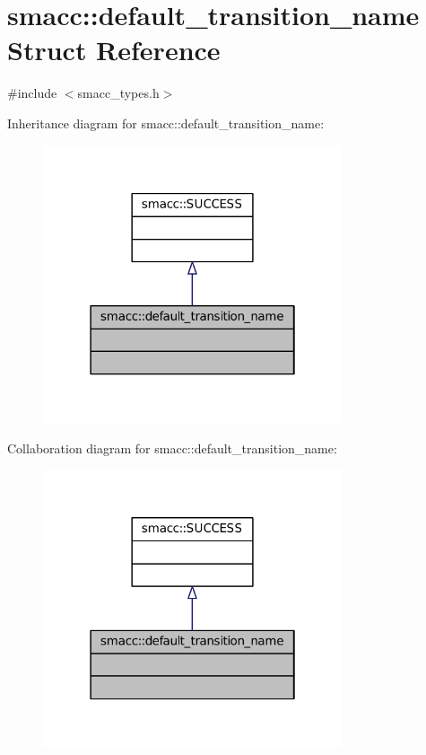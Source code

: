 \hypertarget{structsmacc_1_1default__transition__name}{}\section{smacc\+:\+:default\+\_\+transition\+\_\+name Struct Reference}
\label{structsmacc_1_1default__transition__name}


{\ttfamily \#include $<$smacc\+\_\+types.\+h$>$}



Inheritance diagram for smacc\+:\+:default\+\_\+transition\+\_\+name\+:
\nopagebreak
\begin{figure}[H]
\begin{center}
\leavevmode
\includegraphics[width=250pt]{structsmacc_1_1default__transition__name__inherit__graph}
\end{center}
\end{figure}


Collaboration diagram for smacc\+:\+:default\+\_\+transition\+\_\+name\+:
\nopagebreak
\begin{figure}[H]
\begin{center}
\leavevmode
\includegraphics[width=250pt]{structsmacc_1_1default__transition__name__coll__graph}
\end{center}
\end{figure}


